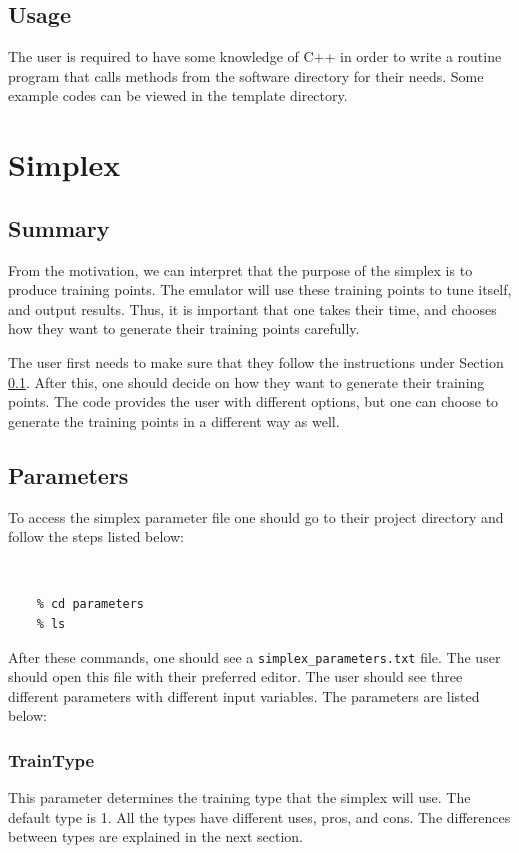 \documentclass[12pt]{article}
\numberwithin{equation}{section}
\numberwithin{figure}{section}
\begin{document}
\subsection{Usage}
\label{sec:Usage}

The user is required to have some knowledge of C++ in order to write a routine program that calls methods from the software directory for their needs. Some example codes can be viewed in the template directory.

\section{Simplex}

\subsection{Summary}
From the motivation, we can interpret that the purpose of the simplex is to produce training points. The emulator will use these training points to tune itself, and output results. Thus, it is important that one takes their time, and chooses how they want to generate their training points carefully.

The user first needs to make sure that they follow the instructions under Section \ref{sec:Usage}. After this, one should decide on how they want to generate their training points. The code provides the user with different options, but one can choose to generate the training points in a different way as well.

\subsection{Parameters}

To access the simplex parameter file one should go to their project directory and follow the steps listed below:

{\tt
\begin{verbatim}
    % cd parameters 
    % ls
\end{verbatim}
}
After these commands, one should see a {\tt{simplex\_parameters.txt}} file. The user should open this file with their preferred editor. The user should see three different parameters with different input variables. The parameters are listed below:

\subsubsection{TrainType}
This parameter determines the training type that the simplex will use. The default type is 1. All the types have different uses, pros, and cons. The differences between types are explained in the next section.
\end{document}
